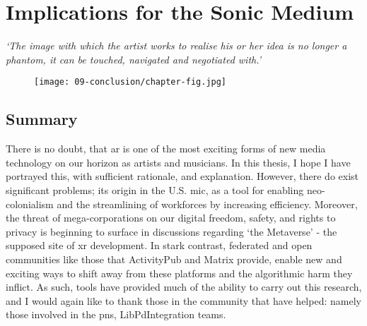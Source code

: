 \chapter{Implications for the Sonic Medium}{}
\label{sec: conclusion}
\epigraph{\textit{`The image with which the artist works to realise his or her idea is no longer a phantom, it can be touched, navigated and negotiated with.'}}{\citep[p.5]{ryan1991}}

\begin{figure}
    \centering
    \texttt{[image: 09-conclusion/chapter-fig.jpg]}
    \captionsetup{labelformat=empty}
    \caption[\autoref*{sec: conclusion}'s page-figure: \href{https://www.sambilbow.com/projects/comuse}{coMuse} being developed, using \href{https://monado.dev}{Monado} and \href{https://stardustxr.org/}{StardustXR}, (from \href{https://youtu.be/zG__m-gV1qI}{my YouTube channel})]{}
\end{figure}

\clearpage

\section{Summary}\label{sec: conclusion-summary}
There is no doubt, that \gls{ar} is one of the most exciting forms of new media technology on our horizon as artists and musicians. In this thesis, I hope I have portrayed this, with sufficient rationale, and explanation. However, there do exist significant problems; its origin in the U.S. \gls{mic}, as a tool for enabling neo-colonialism and the streamlining of workforces by increasing efficiency. Moreover, the threat of mega-corporations on our digital freedom, safety, and rights to privacy is beginning to surface in discussions regarding `the Metaverse' - the supposed site of \gls{xr} development. In stark contrast, federated and open communities like those that ActivityPub and Matrix provide, enable new and exciting ways to shift away from these platforms and the algorithmic harm they inflict. As such,  tools have provided much of the ability to carry out this research, and I would again like to thank those in the community that have helped: namely those involved in the \gls{pns}, LibPdIntegration teams.

